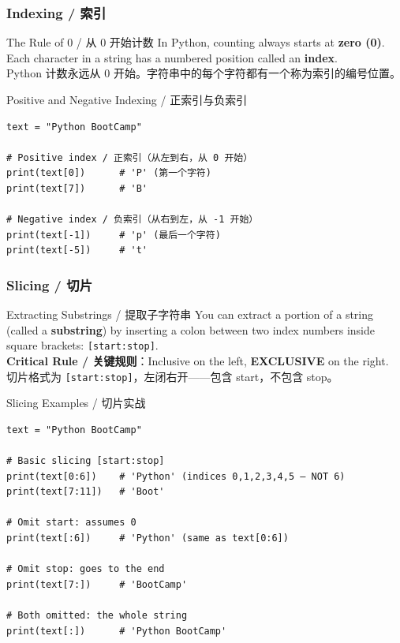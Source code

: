 \documentclass[11pt,a4paper]{report}
\let\oldtexttt\texttt
\renewcommand{\texttt}[1]{\textcolor{mainblue}{\oldtexttt{#1}}}
\begin{document}
\subsubsection{Indexing / 索引}
\begin{concept}{The Rule of 0 / 从 0 开始计数}
    In Python, counting always starts at \textbf{zero (0)}. Each character in a string has a numbered position called an \textbf{index}. \\
    Python 计数永远从 0 开始。字符串中的每个字符都有一个称为索引的编号位置。
\end{concept}

\begin{examplebox}{Positive and Negative Indexing / 正索引与负索引}
\begin{lstlisting}
text = "Python BootCamp"

# Positive index / 正索引（从左到右，从 0 开始）
print(text[0])      # 'P' (第一个字符)
print(text[7])      # 'B'

# Negative index / 负索引（从右到左，从 -1 开始）
print(text[-1])     # 'p' (最后一个字符)
print(text[-5])     # 't'
\end{lstlisting}
\end{examplebox}

\subsubsection{Slicing / 切片}
\begin{concept}{Extracting Substrings / 提取子字符串}
    You can extract a portion of a string (called a \textbf{substring}) by inserting a colon between two index numbers inside square brackets: \texttt{[start:stop]}. \\
    \textbf{Critical Rule / 关键规则}：Inclusive on the left, \textbf{EXCLUSIVE} on the right. \\
    切片格式为 \texttt{[start:stop]}，左闭右开——包含 start，不包含 stop。
\end{concept}

\begin{examplebox}{Slicing Examples / 切片实战}
\begin{lstlisting}
text = "Python BootCamp"

# Basic slicing [start:stop]
print(text[0:6])    # 'Python' (indices 0,1,2,3,4,5 — NOT 6)
print(text[7:11])   # 'Boot'

# Omit start: assumes 0
print(text[:6])     # 'Python' (same as text[0:6])

# Omit stop: goes to the end
print(text[7:])     # 'BootCamp'

# Both omitted: the whole string
print(text[:])      # 'Python BootCamp'
\end{lstlisting}
\end{examplebox}
\end{document}
